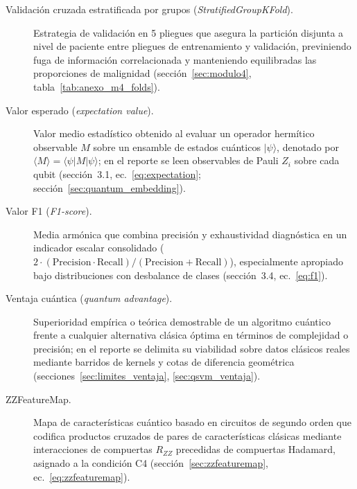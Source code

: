 \begin{description}
  \item[Validación cruzada estratificada por grupos (\textit{StratifiedGroupKFold}).] Estrategia de validación en 5 pliegues que asegura la partición disjunta a nivel de paciente entre pliegues de entrenamiento y validación, previniendo fuga de información correlacionada y manteniendo equilibradas las proporciones de malignidad (sección~\ref{sec:modulo4}, tabla~\ref{tab:anexo_m4_folds}).

  \item[Valor esperado (\textit{expectation value}).] Valor medio estadístico obtenido al evaluar un operador hermítico observable $M$ sobre un ensamble de estados cuánticos $|\psi\rangle$, denotado por $\langle M \rangle = \langle \psi|M|\psi\rangle$; en el reporte se leen observables de Pauli $Z_i$ sobre cada qubit (sección~3.1, ec.~\ref{eq:expectation}; sección~\ref{sec:quantum_embedding}).

  \item[Valor F1 (\textit{F1-score}).] Media armónica que combina precisión y exhaustividad diagnóstica en un indicador escalar consolidado ($2 \cdot (\mathrm{Precision} \cdot \mathrm{Recall}) / (\mathrm{Precision} + \mathrm{Recall})$), especialmente apropiado bajo distribuciones con desbalance de clases (sección~3.4, ec.~\ref{eq:f1}).

  \item[Ventaja cuántica (\textit{quantum advantage}).] Superioridad empírica o teórica demostrable de un algoritmo cuántico frente a cualquier alternativa clásica óptima en términos de complejidad o precisión; en el reporte se delimita su viabilidad sobre datos clásicos reales mediante barridos de kernels y cotas de diferencia geométrica (secciones~\ref{sec:limites_ventaja}, \ref{sec:qsvm_ventaja}).

  \item[ZZFeatureMap.] Mapa de características cuántico basado en circuitos de segundo orden que codifica productos cruzados de pares de características clásicas mediante interacciones de compuertas $R_{ZZ}$ precedidas de compuertas Hadamard, asignado a la condición C4 (sección~\ref{sec:zzfeaturemap}, ec.~\ref{eq:zzfeaturemap}).
\end{description}
